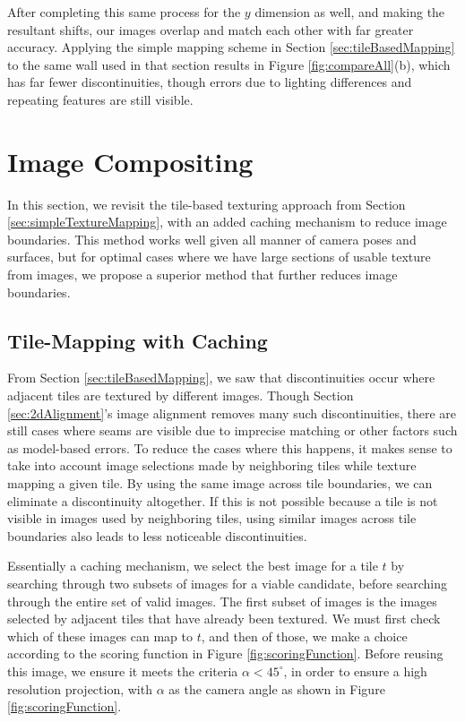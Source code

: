 \documentclass[]{spie}  %
\begin{document}
After completing this same process for the $y$ dimension as well, and
making the resultant shifts, our images overlap and match each other
with far greater accuracy. Applying the simple mapping scheme in
Section \ref{sec:tileBasedMapping} to the same wall used in that
section results in Figure \ref{fig:compareAll}(b), which has far fewer
discontinuities, though errors due to lighting differences and
repeating features are still visible.

\section{Image Compositing}
\label{sec:imageCompositing}
In this section, we revisit the tile-based texturing approach from
Section \ref{sec:simpleTextureMapping}, with an added caching
mechanism to reduce image boundaries. This method works well given all
manner of camera poses and surfaces, but for optimal cases where we
have large sections of usable texture from images, we propose a
superior method that further reduces image boundaries.

\subsection{Tile-Mapping with Caching}
\label{sec:mappingWithCaching}
From Section \ref{sec:tileBasedMapping}, we saw that discontinuities
occur where adjacent tiles are textured by different images. Though
Section \ref{sec:2dAlignment}'s image alignment removes many such
discontinuities, there are still cases where seams are visible due to
imprecise matching or other factors such as model-based errors. To
reduce the cases where this happens, it makes sense to take into
account image selections made by neighboring tiles while texture
mapping a given tile. By using the same image across tile boundaries,
we can eliminate a discontinuity altogether. If this is not possible
because a tile is not visible in images used by neighboring tiles,
using similar images across tile boundaries also leads to less
noticeable discontinuities.

Essentially a caching mechanism, we select the best image for a tile
$t$ by searching through two subsets of images for a viable candidate,
before searching through the entire set of valid images. The first
subset of images is the images selected by adjacent tiles that have
already been textured. We must first check which of these images can
map to $t$, and then of those, we make a choice according to the
scoring function in Figure \ref{fig:scoringFunction}. Before reusing
this image, we ensure it meets the criteria $\alpha < 45^\circ$, in
order to ensure a high resolution projection, with $\alpha$ as the
camera angle as shown in Figure \ref{fig:scoringFunction}.
\end{document}

